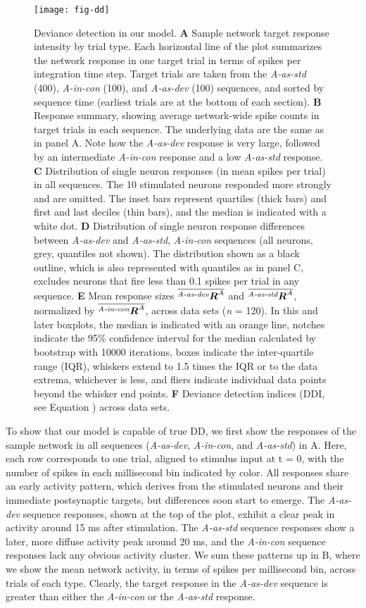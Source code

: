 \documentclass[9pt,lineno,onehalfspacing]{elife}
\newcommand{\dev}{\textit{A-as-dev}}
\newcommand{\msc}{\textit{A-in-con}}
\newcommand{\std}{\textit{A-as-std}}
\newcommand{\ifstringequal}[4]{%
  \ifnum\pdfstrcmp{#1}{#2}=0
  #3%
  \else
  #4%
  \fi
}
\newcommand{\seqreplace}[1]{\ifstringequal{dev}{#1}{\dev}{%
    \ifstringequal{std}{#1}{\std}{%
        \ifstringequal{msc}{#1}{\msc}{#1}%
    }%
}}
\newcommand{\R}[3][]{{}^{\seqreplace{#1}}_{}\boldsymbol R^{#2}_{#3}}
\newcommand{\mean}[1]{\overline{#1}}
\begin{document}
\begin{figure}
    \texttt{[image: fig-dd]}
    \caption{%
        Deviance detection in our model.
        \textbf{A} Sample network target response intensity by trial type. Each horizontal line of the plot summarizes the network response in one target trial in terms of spikes per integration time step. Target trials are taken from the \std{} (400), \msc{} (100), and \dev{} (100) sequences, and sorted by sequence time (earliest trials are at the bottom of each section).
        \textbf{B} Response summary, showing average network-wide spike counts in target trials in each sequence. The underlying data are the same as in panel A. Note how the \dev{} response is very large, followed by an intermediate \msc{} response and a low \std{} response.
        \textbf{C} Distribution of single neuron responses (in mean spikes per trial) in all sequences. The 10 stimulated neurons responded more strongly and are omitted. The inset bars represent quartiles (thick bars) and first and last deciles (thin bars), and the median is indicated with a white dot.
        \textbf{D} Distribution of single neuron response differences between \dev{} and \std{}, \msc{} sequences (all neurons, grey, quantiles not shown). The distribution shown as a black outline, which is also represented with quantiles as in panel C, excludes neurons that fire less than 0.1 spikes per trial in any sequence.
        \textbf{E} Mean response sizes $\mean{\R[dev]{A}{}}$ and $\mean{\R[std]{A}{}}$, normalized by $\mean{\R[msc]{A}{}}$, across data sets (\textit{n} = 120). In this and later boxplots, the median is indicated with an orange line, notches indicate the 95\% confidence interval for the median calculated by bootstrap with 10000 iterations, boxes indicate the inter-quartile range (IQR), whiskers extend to 1.5 times the IQR or to the data extrema, whichever is less, and fliers indicate individual data points beyond the whisker end points.
        \textbf{F} Deviance detection indices (DDI, see Equation ) across data sets.
    }
    \label{fig:DD}
\end{figure}

To show that our model is capable of true DD, we first show the responses of the sample network in all sequences (\dev{}, \msc{}, and \std{}) in A. Here, each row corresponds to one trial, aligned to stimulus input at t = 0, with the number of spikes in each millisecond bin indicated by color. All responses share an early activity pattern, which derives from the stimulated neurons and their immediate postsynaptic targets, but differences soon start to emerge. The \dev{} sequence responses, shown at the top of the plot, exhibit a clear peak in activity around 15 ms after stimulation. The \std{} sequence responses show a later, more diffuse activity peak around 20 ms, and the \msc{} sequence responses lack any obvious activity cluster. We sum these patterns up in B, where we show the mean network activity, in terms of spikes per millisecond bin, across trials of each type. Clearly, the target response in the \dev{} sequence is greater than either the \msc{} or the \std{} response.
\end{document}
